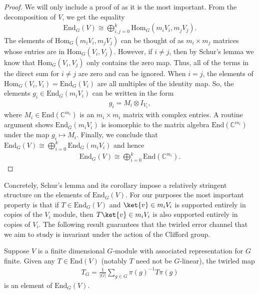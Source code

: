 \begin{proof}
    We will only include a proof of  as it is the most important.
    From the decomposition of $V$, we get the equality
    \begin{align}
        \mathrm{End}_G(V) \cong \bigoplus_{i,j = 0}^k \mathrm{Hom}_G(m_iV_i,m_jV_j).
    \end{align}
    The elements of $\mathrm{Hom}_G(m_i V_i, m_j V_j)$ can be thought of as $m_i \times m_j$ matrices whose entries are in $\mathrm{Hom}_G(V_i, V_j)$. 
    However, if $i \neq j$, then by Schur's lemma we know that $\mathrm{Hom}_G(V_i, V_j)$ only contains the zero map. 
    Thus, all of the terms in the direct sum for $i \neq j$ are zero and can be ignored. 
    When $i = j$, the elements of $\mathrm{Hom}_G(V_i,V_i) = \mathrm{End}_G(V_i)$ are all multiples of the identity map. 
    So, the elements $g_i \in \mathrm{End}_G(m_iV_i)$ can be written in the form
    \begin{align}
        g_i = M_i \otimes I_{V_i},
    \end{align}
    where $M_i \in \mathrm{End}(\mathbb{C}^{m_i})$ is an $m_i \times m_i$ matrix with complex entries. 
    A routine argument shows $\mathrm{End}_G(m_iV_i)$ is isomorphic to the matrix algebra $\mathrm{End}(\mathbb{C}^{m_i})$ under the map $g_i \mapsto M_i$.
    Finally, we conclude that $\mathrm{End}_G(V) \cong \bigoplus_{i = 0}^k \mathrm{End}_G(m_i V_i)$ and hence
    \begin{align}
        \mathrm{End}_G(V) \cong \bigoplus_{i=0}^k \mathrm{End}(\mathbb{C}^{m_i}).
    \end{align}
\end{proof}

Concretely, Schur's lemma and its corollary impose a relatively stringent structure on the elements of $\mathrm{End}_G(V)$. 
For our purposes the most important property is that if $T \in \mathrm{End}_G(V)$ and $\ket{v} \in m_i V_i$ is supported entirely in copies of the $V_i$ module, then $T\ket{v} \in m_i V_i$ is also supported entirely in copies of $V_i$. 
The following result guarantees that the twirled error channel that we aim to study is invariant under the action of the Clifford group.

\begin{lemma}[Twirling] \label{lem:twirling}
    Suppose $V$ is a finite dimensional $G$-module with associated representation for $G$ finite. Given any $T \in \mathrm{End}(V)$ (notably $T$ need not be $G$-linear), the twirled map
    \begin{align}
        T_G = \frac{1}{|G|} \sum_{g \in G} \pi(g)^{-1} T \pi(g)
    \end{align}
    is an element of $\mathrm{End}_G(V)$.
\end{lemma}

